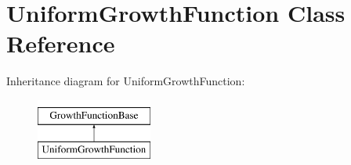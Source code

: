 \hypertarget{classUniformGrowthFunction}{}\section{Uniform\+Growth\+Function Class Reference}
\label{classUniformGrowthFunction}
Inheritance diagram for Uniform\+Growth\+Function\+:\begin{figure}[H]
\begin{center}
\leavevmode
\includegraphics[height=2.000000cm]{classUniformGrowthFunction}
\end{center}
\end{figure}
